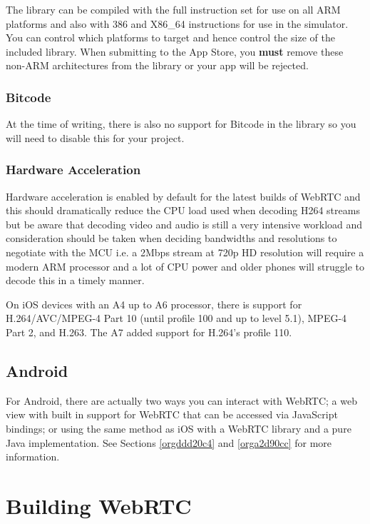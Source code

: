 \documentclass[a4paper,11pt]{article}
\begin{document}
The library can be compiled with the full instruction set for use on
all ARM platforms and also with 386 and X86\_64 instructions for use in
the simulator.  You can control which platforms to target and hence
control the size of the included library.  When submitting to the App
Store, you \textbf{must} remove these non-ARM architectures from the
library or your app will be rejected.

\subsubsection{Bitcode}
\label{sec:orgb0f2682}

At the time of writing, there is also no support for Bitcode in the
library so you will need to disable this for your project.

\subsubsection{Hardware Acceleration}
\label{sec:orgc9474ae}

Hardware acceleration is enabled by default for the latest builds of
WebRTC and this should dramatically reduce the CPU load used when
decoding H264 streams but be aware that decoding video and audio is
still a very intensive workload and consideration should be taken when
deciding bandwidths and resolutions to negotiate with the MCU i.e. a
2Mbps stream at 720p HD resolution will require a modern ARM processor
and a lot of CPU power and older phones will struggle to decode this
in a timely manner.

On iOS devices with an A4 up to A6 processor, there is support for
H.264/AVC/MPEG-4 Part 10 (until profile 100 and up to level 5.1),
MPEG-4 Part 2, and H.263.  The A7 added support for H.264’s
profile 110.

\subsection{Android}
\label{sec:orgc7c126a}

For Android, there are actually two ways you can interact with WebRTC;
a web view with built in support for WebRTC that can be accessed via
JavaScript bindings; or using the same method as iOS with a WebRTC
library and a pure Java implementation.  See Sections
\ref{orgddd20c4} and \ref{orga2d90cc} for more
information.

\section{Building WebRTC}
\label{sec:org3a78d92}
\end{document}
